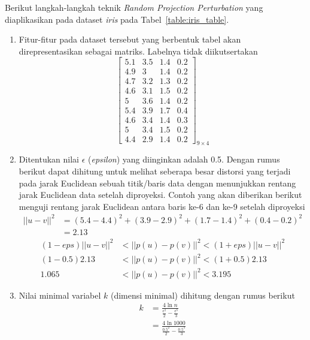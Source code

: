 Berikut langkah-langkah teknik \textit{Random Projection Perturbation} yang diaplikasikan pada dataset \textit{iris} pada Tabel~\ref{table:iris_table}.
\begin{enumerate}
    \item Fitur-fitur pada dataset tersebut yang berbentuk tabel akan direpresentasikan sebagai matriks. Labelnya tidak diikutsertakan
    \[
        \begin{bmatrix}
        5.1		&		3.5		&		1.4		&		0.2	\\
        4.9		&		3		&		1.4		&		0.2	\\
        4.7		&		3.2		&		1.3		&		0.2	\\
        4.6		&		3.1		&		1.5		&		0.2	\\
        5		&		3.6		&		1.4		&		0.2	\\
        5.4		&		3.9		&		1.7		&		0.4	\\
        4.6		&		3.4		&		1.4		&		0.3	\\
        5		&		3.4		&		1.5		&		0.2	\\
        4.4		&		2.9		&		1.4		&		0.2 
        \end{bmatrix}_{9\times 4}
    \]
    \item Ditentukan nilai \(\epsilon\) (\textit{epsilon}) yang diinginkan adalah 0.5. Dengan rumus berikut dapat dihitung untuk melihat seberapa besar distorsi yang terjadi pada jarak Euclidean sebuah titik/baris data dengan menunjukkan rentang jarak Euclidean data setelah diproyeksi. Contoh yang akan diberikan berikut menguji rentang jarak Euclidean antara baris ke-6 dan ke-9 setelah diproyeksi
    \begin{align*}
        ||u - v||^{2} &= (5.4-4.4)^2 + (3.9-2.9)^2 + (1.7-1.4)^2 + (0.4-0.2)^2
        \\
        &= 2.13
    \end{align*}
    \begin{align*}
        (1-eps)||u - v||^{2}&<||p(u) - p(v)||^{2}<(1+eps)||u - v||^{2}
        \\
        (1-0.5)2.13&<||p(u) - p(v)||^{2}<(1+0.5)2.13
        \\
        1.065&<||p(u) - p(v)||^{2}<3.195
    \end{align*}
    \item Nilai minimal variabel \(k\) (dimensi minimal) dihitung dengan rumus berikut
    \begin{align*}
        k &= \frac{4\ln{n}}{\frac{\epsilon^{2}}{2}-\frac{\epsilon^{3}}{3}} \\
        &= \frac{4\ln{1000}}{\frac{0.5^{2}}{2}-\frac{0.5^{3}}{3}} \\

\end{align*}
\end{enumerate}
